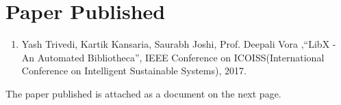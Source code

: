 \documentclass[a4paper,12pt]{report}
\begin{document}
\section{Paper Published}
\begin{enumerate}
  \item Yash Trivedi, Kartik Kansaria, Saurabh Joshi, Prof. Deepali Vora ,``LibX - An Automated Bibliotheca'', IEEE Conference on ICOISS(International Conference on Intelligent Sustainable Systems), 2017.
\end{enumerate}
 \par The paper published is attached as a document on the next page.\\
 
\pagebreak 
 
\FloatBarrier
\begin{figure}
    \centering
    
 \end{figure}
 
 \pagebreak 
 
 \FloatBarrier
\begin{figure}
    \centering
    
 \end{figure}
 
 \pagebreak 
 
 \FloatBarrier
\begin{figure}
    \centering
    
 \end{figure}
 
 \pagebreak 
 
 \FloatBarrier
\begin{figure}
    \centering
    
 \end{figure}

\pagebreak 
 
 \FloatBarrier
\begin{figure}
    \centering
    
 \end{figure}
 
\end{document}
